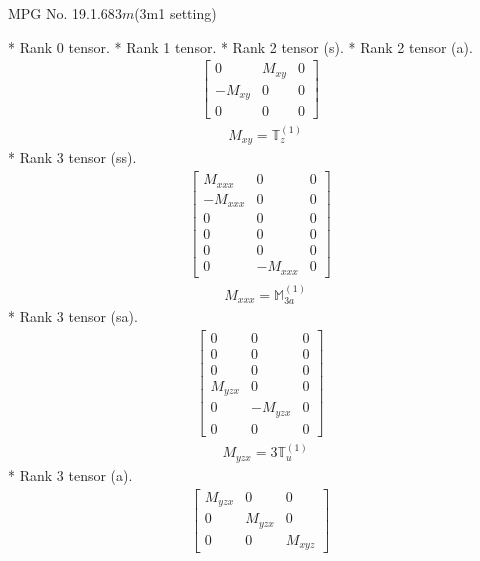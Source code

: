 \documentclass[fleqn,8pt,landscape]{jsarticle}
\begin{document}
\setcounter{MaxMatrixCols}{32}

\renewcommand{\tablename}{Table~}
\renewcommand{\figurename}{Figure~}
\begin{center}
\LARGE
MPG No. 19.1.68\quad$3m$\quad(3m1 setting)
\end{center}
* Rank 0 tensor.
* Rank 1 tensor.
* Rank 2 tensor (s).
* Rank 2 tensor (a).
\begin{align*}
\begin{bmatrix} 0 & M_{xy} & 0 \\ - M_{xy} & 0 & 0 \\ 0 & 0 & 0 \end{bmatrix}
\end{align*}
\begin{align*}
& M_{xy} = \mathbb{T}_{z}^{(1)}
\end{align*}
* Rank 3 tensor (ss).
\begin{align*}
\begin{bmatrix} M_{xxx} & 0 & 0 \\ - M_{xxx} & 0 & 0 \\ 0 & 0 & 0 \\ 0 & 0 & 0 \\ 0 & 0 & 0 \\ 0 & - M_{xxx} & 0 \end{bmatrix}
\end{align*}
\begin{align*}
& M_{xxx} = \mathbb{M}_{3a}^{(1)}
\end{align*}
* Rank 3 tensor (sa).
\begin{align*}
\begin{bmatrix} 0 & 0 & 0 \\ 0 & 0 & 0 \\ 0 & 0 & 0 \\ M_{yzx} & 0 & 0 \\ 0 & - M_{yzx} & 0 \\ 0 & 0 & 0 \end{bmatrix}
\end{align*}
\begin{align*}
& M_{yzx} = 3 \mathbb{T}_{u}^{(1)}
\end{align*}
* Rank 3 tensor (a).
\begin{align*}
\begin{bmatrix} M_{yzx} & 0 & 0 \\ 0 & M_{yzx} & 0 \\ 0 & 0 & M_{xyz} \end{bmatrix}
\end{align*}
\end{document}
